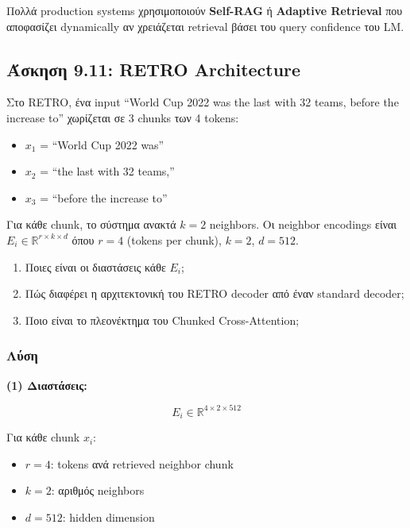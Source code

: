 \begin{warningbox}
Πολλά production systems χρησιμοποιούν \textbf{Self-RAG} ή \textbf{Adaptive Retrieval}
που αποφασίζει dynamically αν χρειάζεται retrieval βάσει του query confidence του LM.
\end{warningbox}

\subsection{Άσκηση 9.11: RETRO Architecture}

\begin{formulabox}[Εκφώνηση]
Στο RETRO, ένα input ``World Cup 2022 was the last with 32 teams, before the
increase to'' χωρίζεται σε 3 chunks των 4 tokens:
\begin{itemize}
    \item $x_1$ = ``World Cup 2022 was''
    \item $x_2$ = ``the last with 32 teams,''
    \item $x_3$ = ``before the increase to''
\end{itemize}

Για κάθε chunk, το σύστημα ανακτά $k=2$ neighbors. Οι neighbor encodings είναι
$E_i \in \mathbb{R}^{r \times k \times d}$ όπου $r=4$ (tokens per chunk), $k=2$, $d=512$.

\begin{enumerate}
    \item Ποιες είναι οι διαστάσεις κάθε $E_i$;
    \item Πώς διαφέρει η αρχιτεκτονική του RETRO decoder από έναν standard decoder;
    \item Ποιο είναι το πλεονέκτημα του Chunked Cross-Attention;
\end{enumerate}
\end{formulabox}

\subsubsection*{Λύση}

\textbf{(1) Διαστάσεις:}

$$E_i \in \mathbb{R}^{4 \times 2 \times 512}$$

Για κάθε chunk $x_i$:
\begin{itemize}
    \item $r = 4$: tokens ανά retrieved neighbor chunk
    \item $k = 2$: αριθμός neighbors
    \item $d = 512$: hidden dimension
\end{itemize}

